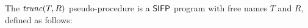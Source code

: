 \begin{defn}
  \label{def:trunc}
The $\mathit{trunc}(T, R)$ pseudo-procedure is a $\mathsf{SIFP}$ program with free names $T$ and $R$, defined as follows:
%
\begin{comment}
\begin{align*}
trunc(T, R) \coloneqq &Q \takes R;\\
                      &R \takes \epsilon;\\
                      &Z \takes \epsilon;\\
                      &\while {Z \sqsubset T} {\\
                      &\quad B \takes \one;\\
                      &\quad \while {Z.\zero \sqsubseteq T \land B} {\\
                      &\quad \quad B \takes \one;\\
                      &\quad \quad \while {R.\zero \sqsubseteq Q \land B} {\\
                      &\quad \quad \quad R \takes R.\zero;\\
                      &\quad \quad \quad B \takes \zero;\\
                      &\quad \quad \quad }\\
                      &\quad \quad \while {R.\one \sqsubseteq Q \land B} {\\
                      &\quad \quad \quad R \takes R.\one;\\
                      &\quad \quad \quad B \takes \zero;\\
                      &\quad \quad \quad }\\
                      &\quad \quad Z \takes Z.0;\\
                      &\quad \quad B \takes 0;\\
                      &\quad \quad }\\
                      &\quad \while {Z.\one \sqsubseteq T \land B} {\\
                      &\quad \quad B \takes \one;\\
                      &\quad \quad \while {R.\zero \sqsubseteq Q \land B} {\\
                      &\quad \quad \quad R \takes R.\zero;\\
                      &\quad \quad \quad B \takes \zero;\\
                      &\quad \quad \quad }\\

\end{comment}
\end{defn}
